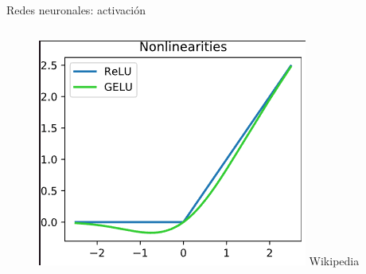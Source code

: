 \begin{frame}{Redes neuronales: activación}
\begin{columns}[c]
\begin{column}{0.3\textwidth}
\end{column}
\begin{column}{0.3\textwidth}
    \centering
    \includegraphics[width=\textwidth]{Slides/figures/Introduccion/relu.png}
    \scriptsize{Wikipedia}
\end{column}
\begin{column}{0.3\textwidth}
    \centering

\end{column}
\end{columns}
\end{frame}
